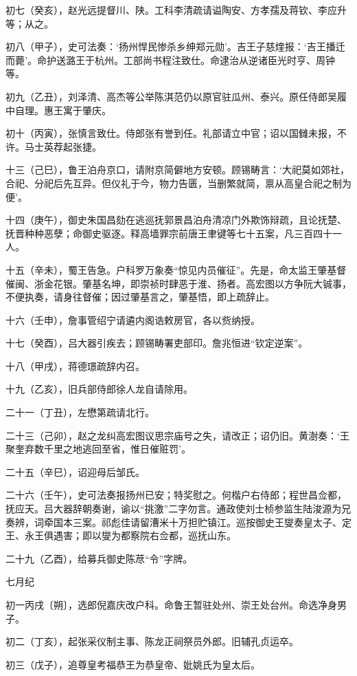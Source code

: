 \documentclass[]{article}
\begin{document}
初七（癸亥），赵光远提督川、陕。工科李清疏请谥陶安、方孝孺及蒋钦、李应升等；从之。

初八（甲子），史可法奏：`扬州悍民惨杀乡绅郑元勋'。吉王子慈煃报：`吉王播迁而薨'。命护送潞王于杭州。工部尚书程注致仕。命逮治从逆诸臣光时亨、周钟等。

初九（乙丑），刘泽清、高杰等公举陈淇范仍以原官驻瓜州、泰兴。原任侍郎吴履中自理。惠王寓于肇庆。

初十（丙寅），张慎言致仕。侍郎张有誉到任。礼部请立中官；诏以国雠未报，不许。马士英荐起张捷。

十三（己巳），鲁王泊舟京口，请附京简僻地方安顿。顾锡畴言：`大祀莫如郊社，合祀、分祀后先互异。但仪礼于今，物力告匮，当删繁就简，禀从高皇合祀之制为便'。

十四（庚午），御史朱国昌劾在逃巡抚郭景昌泊舟清凉门外欺饰辩疏，且论抚楚、抚晋种种恶孽；命御史驱逐。释高墙罪宗前唐王聿键等七十五案，凡三百四十一人。

十五（辛未），蜀王告急。户科罗万象奏``惊见内员催征''。先是，命太监王肇基督催闽、浙金花银。肇基名坤，即崇祯时肆恶于淮、扬者。高宏图以方争阮大铖事，不便执奏，请身往督催；因过肇基言之，肇基悟，即上疏辞止。

十六（壬申），詹事管绍宁请遴内阁诰敕房官，各以赀纳授。

十七（癸酉），吕大器引疾去；顾锡畴署吏部印。詹兆恒进``钦定逆案''。

十八（甲戌），蒋德璟疏辞内召。

十九（乙亥），旧兵部侍郎徐人龙自请除用。

二十一（丁丑），左懋第疏请北行。

二十三（己卯），赵之龙纠高宏图议思宗庙号之失，请改正；诏仍旧。黄澍奏：`王聚奎弃数千里之地逃回至省，惟日催赃罚'。

二十五（辛巳），诏迎母后邹氏。

二十六（壬午），史可法奏报扬州已安；特奖慰之。何楷户右侍郎；程世昌佥都，抚应天。吕大器辞朝奏谢，谕以``挑激''二字勿言。通政使刘士桢参监生陆浚源为兄奏辨，词牵国本三案。祁彪佳请留漕米十万担贮镇江。巡按御史王燮奏皇太子、定王、永王俱遇害；即以燮为都察院右佥都，巡抚山东。

二十九（乙酉），给募兵御史陈荩``令''字牌。

七月纪

初一丙戌〔朔〕，选郎倪嘉庆改户科。命鲁王暂驻处州、崇王处台州。命选净身男子。

初二（丁亥），起张采仪制主事、陈龙正祠祭员外郎。旧辅孔贞运卒。

初三（戊子），追尊皇考福恭王为恭皇帝、妣姚氏为皇太后。
\end{document}

